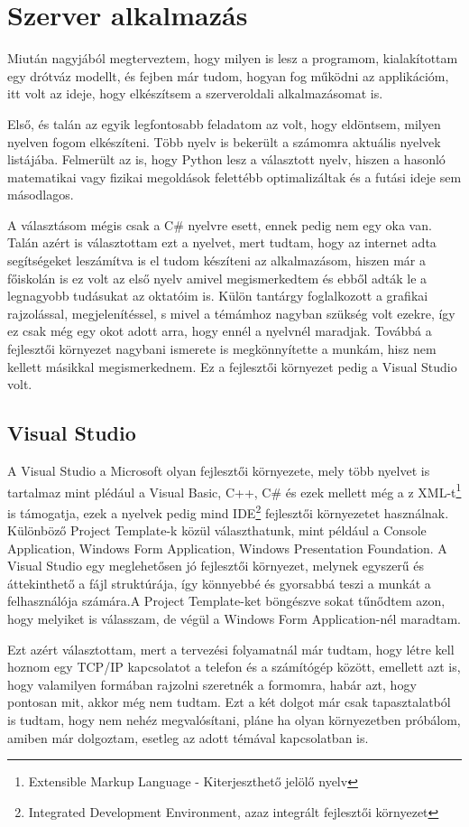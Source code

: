 \documentclass{thesis-ekf}
\theoremstyle{definition}
\theoremstyle{remark}
\begin{document}
\chapter{Szerver alkalmazás}
Miután nagyjából megterveztem, hogy milyen is lesz a programom, kialakítottam egy drótváz modellt, és fejben már tudom, hogyan fog működni az applikációm, itt volt az ideje, hogy elkészítsem a szerveroldali alkalmazásomat is.
\par Első, és talán az egyik legfontosabb feladatom az volt, hogy eldöntsem, milyen nyelven fogom elkészíteni. Több nyelv is bekerült a számomra aktuális nyelvek listájába. Felmerült az is, hogy Python lesz a választott nyelv, hiszen a hasonló matematikai vagy fizikai megoldások felettébb optimalizáltak és a futási ideje sem másodlagos.
\par A választásom mégis csak a C\# nyelvre esett, ennek pedig nem egy oka van. Talán azért is választottam ezt a nyelvet, mert tudtam, hogy az internet adta segítségeket leszámítva is el tudom készíteni az alkalmazásom, hiszen már a főiskolán is ez volt az első nyelv amivel megismerkedtem és ebből adták le a legnagyobb tudásukat az oktatóim is. Külön tantárgy foglalkozott a grafikai rajzolással, megjelenítéssel, s mivel a témámhoz nagyban szükség volt ezekre, így ez csak még egy okot adott arra, hogy ennél a nyelvnél maradjak. Továbbá a fejlesztői környezet nagybani ismerete is megkönnyítette a munkám, hisz nem kellett másikkal megismerkednem. Ez a fejlesztői környezet pedig a Visual Studio volt.
\section{Visual Studio}
A Visual Studio a Microsoft olyan fejlesztői környezete, mely több nyelvet is tartalmaz mint plédául a Visual Basic, C++, C\# és ezek mellett még a z XML-t\footnote{Extensible Markup Language - Kiterjeszthető jelölő nyelv} is támogatja, ezek a nyelvek pedig mind IDE\footnote{Integrated Development Environment, azaz integrált fejlesztői környezet} fejlesztői környezetet használnak. Különböző Project Template-k közül választhatunk, mint például a Console Application, Windows Form Application, Windows Presentation Foundation. A Visual Studio egy meglehetősen jó fejlesztői környezet, melynek egyszerű és áttekinthető a fájl struktúrája, így könnyebbé és gyorsabbá teszi a munkát a felhasználója számára.A Project Template-ket böngészve sokat tűnődtem azon, hogy melyiket is válasszam, de végül a Windows Form Application-nél maradtam. 
\par Ezt azért választottam, mert a tervezési folyamatnál már tudtam, hogy létre kell hoznom egy TCP/IP kapcsolatot a telefon és a számítógép között, emellett azt is, hogy valamilyen formában rajzolni szeretnék a formomra, habár azt, hogy pontosan mit, akkor még nem tudtam. Ezt a két dolgot már csak tapasztalatból is tudtam, hogy nem nehéz megvalósítani, pláne ha olyan környezetben próbálom, amiben már dolgoztam, esetleg az adott témával kapcsolatban is.
\end{document}
